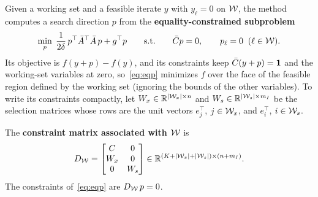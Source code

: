 Given a working set and a feasible iterate $y$ with $y_\ell = 0$ on $\mathcal{W}$, the method
computes a search direction $p$ from the \textbf{equality-constrained subproblem}
\begin{equation} \label{eq:eqp}
\min_{p}\;\frac{1}{2\delta}\,p^\top\bar{A}^\top\bar{A}\,p + g^\top p
\qquad\text{s.t.}\qquad \bar{C} p = 0,\qquad p_\ell = 0\;\;(\ell\in\mathcal{W}).
\end{equation}
Its objective is $f(y + p) - f(y)$, and its constraints keep $\bar{C}(y + p) = \mathbf{1}$ and
the working-set variables at zero, so~\eqref{eq:eqp} minimizes $f$ over the face of the
feasible region defined by the working set (ignoring the bounds of the other variables). To
write its constraints compactly, let $W_x\in\mathbb{R}^{|\mathcal{W}_x|\times n}$ and
$W_s\in\mathbb{R}^{|\mathcal{W}_s|\times m_I}$ be the selection matrices whose rows are the unit vectors
$e_j^\top$, $j\in\mathcal{W}_x$, and $e_i^\top$, $i\in\mathcal{W}_s$.

\begin{definition} \label{def:DW}
The \textbf{constraint matrix associated with $\mathcal{W}$} is
\begin{equation} \label{eq:DW}
D_{\mathcal{W}} = \begin{bmatrix} C & 0\\ W_x & 0\\ 0 & W_s\end{bmatrix}
\in\mathbb{R}^{(K+|\mathcal{W}_x|+|\mathcal{W}_s|)\times(n+m_I)} .
\end{equation}
The constraints of~\eqref{eq:eqp} are $D_{\mathcal{W}}\,p = 0$.
\end{definition}

